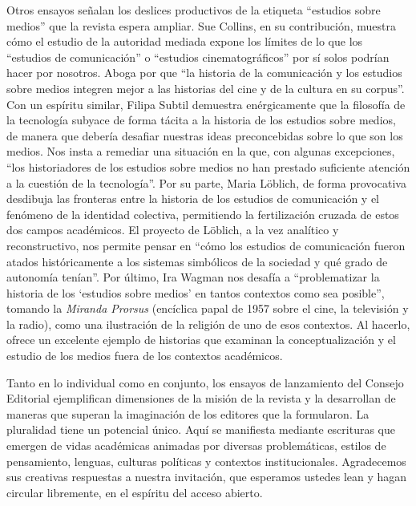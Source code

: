 \documentclass{tufte-handout}
\begin{document}
Otros ensayos señalan los deslices productivos de la etiqueta ``estudios
sobre medios'' que la revista espera ampliar. Sue Collins, en su
contribución, muestra cómo el estudio de la autoridad mediada expone los
límites de lo que los ``estudios de comunicación'' o ``estudios
cinematográficos'' por sí solos podrían hacer por nosotros. Aboga por
que ``la historia de la comunicación y los estudios sobre medios
integren mejor a las historias del cine y de la cultura en su corpus''.
Con un espíritu similar, Filipa Subtil demuestra enérgicamente que la
filosofía de la tecnología subyace de forma tácita a la historia de los
estudios sobre medios, de manera que debería desafiar nuestras ideas
preconcebidas sobre lo que son los medios. Nos insta a remediar una
situación en la que, con algunas excepciones, ``los historiadores de los
estudios sobre medios no han prestado suficiente atención a la cuestión
de la tecnología''. Por su parte, Maria Löblich, de forma provocativa
desdibuja las fronteras entre la historia de los estudios de
comunicación y el fenómeno de la identidad colectiva, permitiendo la
fertilización cruzada de estos dos campos académicos. El proyecto de
Löblich, a la vez analítico y reconstructivo, nos permite pensar en
``cómo los estudios de comunicación fueron atados históricamente a los
sistemas simbólicos de la sociedad y qué grado de autonomía tenían''.
Por último, Ira Wagman nos desafía a ``problematizar la historia de los
`estudios sobre medios' en tantos contextos como sea posible'', tomando
la \emph{Miranda Prorsus} (encíclica papal de 1957 sobre el cine, la
televisión y la radio), como una ilustración de la religión de uno de
esos contextos. Al hacerlo, ofrece un excelente ejemplo de historias que
examinan la conceptualización y el estudio de los medios fuera de los
contextos académicos.

Tanto en lo individual como en conjunto, los ensayos de lanzamiento del
Consejo Editorial ejemplifican dimensiones de la misión de la revista y
la desarrollan de maneras que superan la imaginación de los editores que
la formularon. La pluralidad tiene un potencial único. Aquí se
manifiesta mediante escrituras que emergen de vidas académicas animadas
por diversas problemáticas, estilos de pensamiento, lenguas, culturas
políticas y contextos institucionales. Agradecemos sus creativas
respuestas a nuestra invitación, que esperamos ustedes lean y hagan
circular libremente, en el espíritu del acceso abierto.
\end{document}

